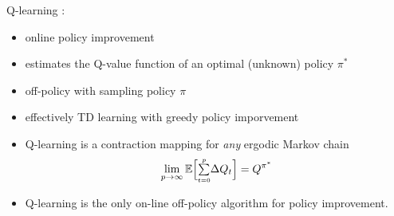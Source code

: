 \begin{frame}\frametitle{\subsecname}

Q-learning \citep{Watkins92}:
\begin{itemize}
\item online policy improvement
\item estimates the Q-value function of an optimal (unknown) policy $\pi^*$
\item off-policy with sampling policy $\pi$
\item effectively TD learning with greedy policy imporvement
\item Q-learning is a contraction mapping for \emph{any} ergodic Markov chain
			\begin{equation}
				\lim\limits_{p \to \infty} \mathbb{E} \Big\lbrack
					{\textstyle \sum\limits_{\scriptscriptstyle t=0}^{\scriptscriptstyle p}} \Delta Q_t \Big\rbrack
				= Q^{\pi^*}
			\end{equation}
\item Q-learning is the only on-line off-policy algorithm for policy improvement.
\end{itemize}

\end{frame}
